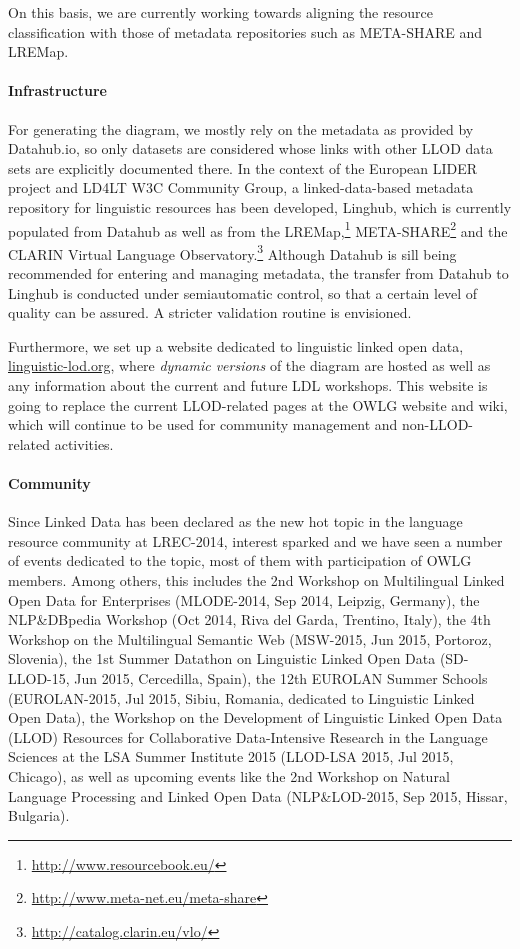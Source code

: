 On this basis, we are currently working towards aligning the resource classification with those of metadata repositories such as META-SHARE and LREMap.

\paragraph{Infrastructure}
For generating the diagram, we mostly rely on the metadata as provided by Datahub.io, so only datasets are considered whose links with other LLOD data sets are explicitly documented there.
In the context of the European LIDER project and LD4LT W3C Community Group, a linked-data-based metadata repository for linguistic resources has been developed, Linghub, which is currently populated from Datahub as well as from the LREMap,\footnote{\url{http://www.resourcebook.eu/}} META-SHARE\footnote{\url{http://www.meta-net.eu/meta-share}} and the CLARIN Virtual Language Observatory.\footnote{
	\url{http://catalog.clarin.eu/vlo/}
}
Although Datahub is sill being recommended for entering and managing metadata, the transfer from Datahub to Linghub is conducted under semiautomatic control, so that a certain level of quality can be assured. A stricter validation routine is envisioned. %

Furthermore, we set up a website dedicated to linguistic linked open data, \url{linguistic-lod.org}, where \emph{dynamic versions} of the diagram are hosted as well as any information about the current and future LDL workshops. This website is going to replace the current LLOD-related pages at the OWLG website and wiki, which will continue to be used for community management and non-LLOD-related activities.

\paragraph{Community}
Since Linked Data has been declared as the new hot topic in the language resource community at LREC-2014, interest sparked and we have seen a number of events dedicated to the topic, most of them with participation of OWLG members. 
Among others, this includes 
the 2nd Workshop on Multilingual Linked Open Data for Enterprises (MLODE-2014, Sep 2014, Leipzig, Germany), 
the NLP\&DBpedia Workshop (Oct 2014, Riva del Garda, Trentino, Italy), 
the 4th Workshop on the Multilingual Semantic Web (MSW-2015, Jun 2015, Portoroz, Slovenia),
the 1st Summer Datathon on Linguistic Linked Open Data (SD-LLOD-15, Jun 2015, Cercedilla, Spain), 
the 12th EUROLAN Summer Schools (EUROLAN-2015, Jul 2015, Sibiu, Romania, dedicated to Linguistic Linked Open Data),
the Workshop on the Development of Linguistic Linked Open Data (LLOD) Resources for Collaborative Data-Intensive Research in the Language Sciences at the LSA Summer Institute 2015 (LLOD-LSA 2015, Jul 2015, Chicago),
as well as upcoming events like 
the 2nd Workshop on Natural Language Processing and Linked Open Data (NLP\&LOD-2015, Sep 2015, Hissar, Bulgaria). 

